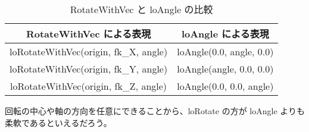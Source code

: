 \begin{table}[H]
\caption{RotateWithVec と loAngle の比較}
\label{tbl:fkAngle1}
\begin{center}
\begin{tabular}{|c|c|}
\hline
RotateWithVec による表現 & loAngle による表現 \\ \hline \hline
loRotateWithVec(origin, fk\_X, angle) & loAngle(0.0, angle, 0.0) \\ \hline
loRotateWithVec(origin, fk\_Y, angle) & loAngle(angle, 0.0, 0.0) \\ \hline
loRotateWithVec(origin, fk\_Z, angle) & loAngle(0.0, 0.0, angle) \\ \hline
\end{tabular}
\end{center}
\end{table}

回転の中心や軸の方向を任意にできることから、loRotate の方が loAngle よりも
柔軟であるといえるだろう。
